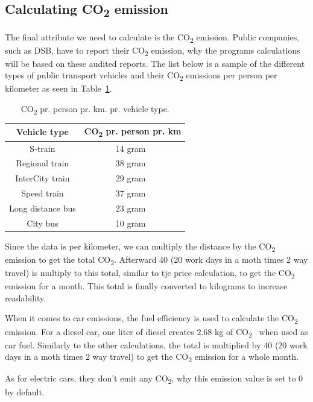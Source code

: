 \subsection{Calculating \unit{CO_{2}} emission}\label{subsec:calculating-co2-emission}

The final attribute we need to calculate is the \unit{CO_{2}} emission.
Public companies, such as DSB, have to report their \unit{CO_{2}} emission, why the programs calculations will be based
on these audited reports.
The list below is a sample of the different types of public transport vehicles and their \unit{CO_{2}} emissions per
person per kilometer as seen in Table~\ref{tab:emissions}.

\begin{table}[H]
    \centering
    \begin{tabular}{ || c | c || }
        \hline
        Vehicle type & \unit{CO_{2}} pr. person pr. km \\
        \hline\hline
        S-train & 14 gram~\cite{dsb2023} \\
        \hline
        Regional train & 38 gram~\cite{dsb2023} \\
        \hline
        InterCity train & 29 gram~\cite{dsb2023} \\
        \hline
        Speed train & 37 gram~\cite{dsb2023} \\
        \hline
        Long distance bus & 23 gram~\cite{cowi2022} \\
        \hline
        City bus & 10 gram~\cite{ntm2023} \\
        \hline
    \end{tabular}
    \caption{\unit{CO_{2}} pr. person pr. km. pr. vehicle type.}
    \label{tab:emissions}
\end{table}

Since the data is per kilometer, we can multiply the distance by the \unit{CO_{2}} emission to get the total
\unit{CO_{2}}.
Afterward 40 (20 work days in a moth times 2 way travel) is multiply to this total, similar to tje price calculation, to get the
\unit{CO_{2}} emission for a month.
This total is finally converted to kilograms to increase readability.

When it comes to car emissions, the fuel efficiency is used to calculate the \unit{CO_{2}} emission.
For a diesel car, one liter of diesel creates 2.68 kg of \unit{CO_{2}}~\cite{co2_car} when used as car fuel.
Similarly to the other calculations, the total is multiplied by 40 (20 work days in a moth times 2 way travel) to get
the \unit{CO_{2}} emission for a whole month.

As for electric cars, they don't emit any \unit{CO_{2}}, why this emission value is set to 0 by default.
